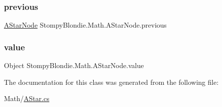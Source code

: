 \subsubsection{\texorpdfstring{previous}{previous}}
{\footnotesize\ttfamily \mbox{\hyperlink{class_stompy_blondie_1_1_math_1_1_a_star_node}{A\+Star\+Node}} Stompy\+Blondie.\+Math.\+A\+Star\+Node.\+previous}

\mbox{\label{class_stompy_blondie_1_1_math_1_1_a_star_node_a14b61327ae92e9836a6b04f686f1ba0d}} 
\subsubsection{\texorpdfstring{value}{value}}
{\footnotesize\ttfamily Object Stompy\+Blondie.\+Math.\+A\+Star\+Node.\+value}



The documentation for this class was generated from the following file\+:\begin{DoxyCompactItemize}
\item 
Math/\mbox{\hyperlink{_a_star_8cs}{A\+Star.\+cs}}\end{DoxyCompactItemize}
